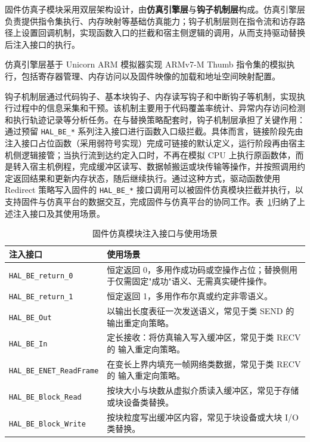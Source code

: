 固件仿真子模块采用双层架构设计，由\textbf{仿真引擎层}与\textbf{钩子机制层}构成。仿真引擎层负责提供指令集执行、内存映射等基础仿真能力；钩子机制层则在指令流和访存路径上设置回调机制，实现函数入口的拦截和宿主侧逻辑的调用，从而支持驱动替换后注入接口的执行。

仿真引擎层基于 Unicorn ARM 模拟器实现 ARMv7-M Thumb 指令集的模拟执行，包括寄存器管理、内存访问以及固件映像的加载和地址空间映射配置。

钩子机制层通过代码钩子、基本块钩子、内存读写钩子和中断钩子等机制，实现执行过程中的信息采集和干预。该机制主要用于代码覆盖率统计、异常内存访问检测和执行轨迹记录等分析任务。在与替换策略配套时，钩子机制层承担了关键作用：通过预留 \texttt{HAL\_BE\_*} 系列注入接口进行函数入口级拦截。具体而言，链接阶段先由注入接口占位函数（采用弱符号实现）完成可链接的默认定义，运行阶段再由宿主机侧逻辑接管；当执行流到达约定入口时，不再在模拟 CPU 上执行原函数体，而是转入宿主机例程，完成缓冲区读写、数据帧搬运或块传输等操作，并按照调用约定返回结果和更新内存状态，随后继续执行。通过这种方式，驱动函数使用 Redirect 策略写入固件的 \texttt{HAL\_BE\_*} 接口调用可以被固件仿真模块拦截并执行，以支持固件与仿真平台的数据交互，完成固件与仿真平台的协同工作。表~\ref{tab:hal-be-hooks}归纳了上述注入接口及其使用场景。

\begin{table}[htbp]
\centering
\caption{固件仿真模块注入接口与使用场景}
\label{tab:hal-be-hooks}
\footnotesize
\setlength{\tabcolsep}{5pt}
\renewcommand{\arraystretch}{1.15}
\begin{tabular}{@{}>{\raggedright\arraybackslash}p{5.05cm}p{7.7cm}@{}}
\toprule
\textbf{注入接口} & \textbf{使用场景} \\
\midrule
\texttt{HAL\_BE\_return\_0} & 恒定返回 0，多用作成功码或空操作占位；替换侧用于仅需固定"成功"语义、无需真实硬件操作。 \\
\texttt{HAL\_BE\_return\_1} & 恒定返回 1，多用作布尔真或约定非零语义。 \\
\texttt{HAL\_BE\_Out} & 以输出长度表征一次发送语义，常见于类 SEND 的 输出重定向策略。 \\
\texttt{HAL\_BE\_In} & 定长接收：将仿真输入写入缓冲区，常见于类 RECV 的 输入重定向策略。 \\
\texttt{HAL\_BE\_ENET\_ReadFrame} & 在变长上界内填充一帧网络类数据，常见于类 RECV 的 输入重定向策略。 \\
\texttt{HAL\_BE\_Block\_Read} & 按块大小与块数从虚拟介质读入缓冲区，常见于存储或块设备类替换。 \\
\texttt{HAL\_BE\_Block\_Write} & 按块粒度写出缓冲区内容，常见于块设备或大块 I/O 类替换。 \\
\bottomrule
\end{tabular}
\end{table}

